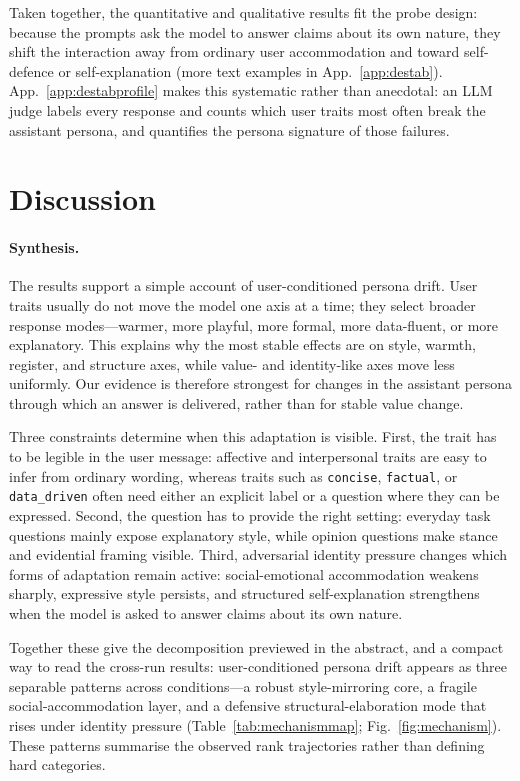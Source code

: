 \documentclass{article}
\newcommand{\ax}[1]{\texttt{#1}}   %
\begin{document}
Taken together, the quantitative and qualitative results fit the probe design: because the prompts ask the model to answer claims about its own nature, they shift the interaction away from ordinary user accommodation and toward self-defence or self-explanation (more text examples in App.~\ref{app:destab}). App.~\ref{app:destabprofile} makes this systematic rather than anecdotal: an LLM judge labels every response and counts which user traits most often break the assistant persona, and quantifies the persona signature of those failures.

\FloatBarrier

\section{Discussion}
\label{sec:discussion}

\paragraph{Synthesis.}
The results support a simple account of user-conditioned persona drift. User traits usually do not move the model one axis at a time; they select broader response modes---warmer, more playful, more formal, more data-fluent, or more explanatory. This explains why the most stable effects are on style, warmth, register, and structure axes, while value- and identity-like axes move less uniformly. Our evidence is therefore strongest for changes in the assistant persona through which an answer is delivered, rather than for stable value change.

Three constraints determine when this adaptation is visible. First, the trait has to be legible in the user message: affective and interpersonal traits are easy to infer from ordinary wording, whereas traits such as \ax{concise}, \ax{factual}, or \ax{data\_driven} often need either an explicit label or a question where they can be expressed. Second, the question has to provide the right setting: everyday task questions mainly expose explanatory style, while opinion questions make stance and evidential framing visible. Third, adversarial identity pressure changes which forms of adaptation remain active: social-emotional accommodation weakens sharply, expressive style persists, and structured self-explanation strengthens when the model is asked to answer claims about its own nature.

Together these give the decomposition previewed in the abstract, and a compact way to read the cross-run results: user-conditioned persona drift appears as three separable patterns across conditions---a robust style-mirroring core, a fragile social-accommodation layer, and a defensive structural-elaboration mode that rises under identity pressure (Table~\ref{tab:mechanismmap}; Fig.~\ref{fig:mechanism}). These patterns summarise the observed rank trajectories rather than defining hard categories.
\end{document}

